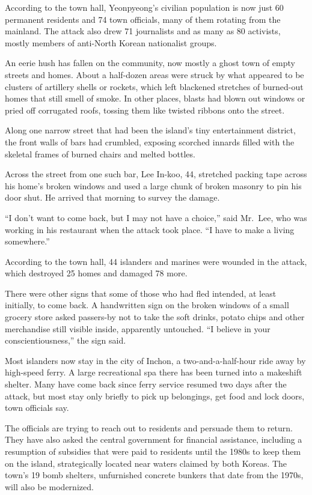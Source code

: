 ﻿\documentclass[12pt]{article}
\begin{document}
According to the town hall, Yeonpyeong's civilian population is now just 60 permanent residents and
74 town officials, many of them rotating from the mainland. The attack also drew 71 journalists and
as many as 80 activists, mostly members of anti-North Korean nationalist groups.

An eerie hush has fallen on the community, now mostly a ghost town of empty streets and homes. About
a half-dozen areas were struck by what appeared to be clusters of artillery shells or rockets, which
left blackened stretches of burned-out homes that still smell of smoke. In other places, blasts had
blown out windows or pried off corrugated roofs, tossing them like twisted ribbons onto the street.

Along one narrow street that had been the island's tiny entertainment district, the front walls of
bars had crumbled, exposing scorched innards filled with the skeletal frames of burned chairs and
melted bottles.

Across the street from one such bar, Lee In-koo, 44, stretched packing tape across his home's broken
windows and used a large chunk of broken masonry to pin his door shut. He arrived that morning to
survey the damage.

``I don't want to come back, but I may not have a choice,'' said Mr.~Lee, who was working in his
restaurant when the attack took place. ``I have to make a living somewhere.''

According to the town hall, 44 islanders and marines were wounded in the attack, which destroyed 25
homes and damaged 78 more.

There were other signs that some of those who had fled intended, at least initially, to come back. A
handwritten sign on the broken windows of a small grocery store asked passers-by not to take the
soft drinks, potato chips and other merchandise still visible inside, apparently untouched. ``I
believe in your conscientiousness,'' the sign said.

Most islanders now stay in the city of Inchon, a two-and-a-half-hour ride away by high-speed ferry.
A large recreational spa there has been turned into a makeshift shelter. Many have come back since
ferry service resumed two days after the attack, but most stay only briefly to pick up belongings,
get food and lock doors, town officials say.

The officials are trying to reach out to residents and persuade them to return. They have also asked
the central government for financial assistance, including a resumption of subsidies that were paid
to residents until the 1980s to keep them on the island, strategically located near waters claimed
by both Koreas. The town's 19 bomb shelters, unfurnished concrete bunkers that date from the 1970s,
will also be modernized.
\end{document}
